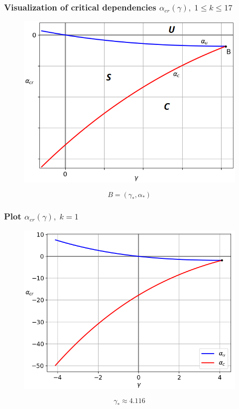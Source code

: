 \documentclass[fullscreen=true, unicode, bookmarks=false]{beamer}
\begin{document}
\begin{frame}
\frametitle{ Visualization of critical dependencies $ \alpha_{cr}(\gamma), \; 1 \leqslant k \leqslant 17 $ }

\begin{figure} 
\includegraphics[scale=0.59]{scheme0117.png}  
\end{figure}
$$ B=(\gamma_*, \alpha_*) $$

\end{frame}

\begin{frame}
\frametitle{ Plot $ \alpha_{cr}(\gamma), \; k = 1 $ }

\begin{figure} 
\includegraphics[scale=0.55]{alphas_000.png}  
\end{figure}
$$ \gamma_* \approx 4.116 $$

\end{frame}
\end{document}
